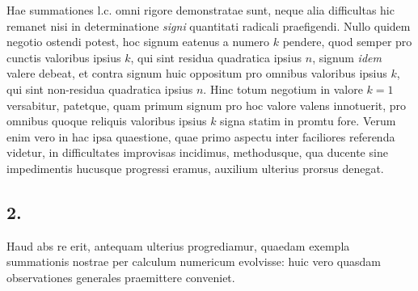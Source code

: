 \documentclass[twoside,12pt]{memoir}
\begin{document}
Hae summationes l.c. omni rigore demonstratae sunt, neque alia difficultas hic remanet nisi in determinatione \textit{signi} quantitati radicali praefigendi. Nullo quidem negotio ostendi potest, hoc signum eatenus a numero \(k\) pendere, quod semper pro cunctis valoribus ipsius \(k\), qui sint residua quadratica ipsius \(n\), signum \textit{idem} valere debeat, et contra signum huic oppositum pro omnibus valoribus ipsius \(k\), qui sint non-residua quadratica ipsius \(n\). Hinc totum negotium in valore \(k=1\) versabitur, patetque, quam primum signum pro hoc valore valens innotuerit, pro omnibus quoque reliquis valoribus ipsius \(k\) signa statim in promtu fore. Verum enim vero in hac ipsa quaestione, quae primo aspectu inter faciliores referenda videtur, in difficultates improvisas incidimus, methodusque, qua ducente sine impedimentis hucusque progressi eramus, auxilium ulterius prorsus denegat.

\subsection*{2.}
 
Haud abs re erit, antequam ulterius progrediamur, quaedam exempla summationis nostrae per calculum numericum evolvisse: huic vero quasdam observationes generales praemittere conveniet.\\
\end{document}
